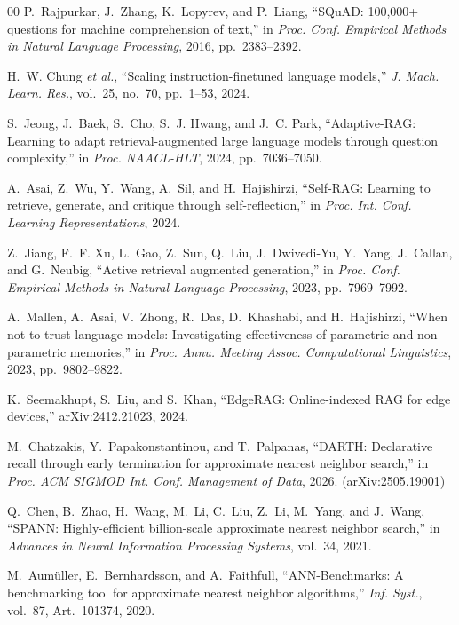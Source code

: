 \documentclass[journal]{IEEEtran}
\begin{document}
\begin{thebibliography}{00}
P.~Rajpurkar, J.~Zhang, K.~Lopyrev, and P.~Liang, ``SQuAD: 100,000+ questions
for machine comprehension of text,'' in \emph{Proc. Conf. Empirical Methods in
Natural Language Processing}, 2016, pp.~2383--2392.

H.~W. Chung \emph{et al.}, ``Scaling instruction-finetuned language models,''
\emph{J. Mach. Learn. Res.}, vol.~25, no.~70, pp.~1--53, 2024.

S.~Jeong, J.~Baek, S.~Cho, S.~J. Hwang, and J.~C. Park, ``Adaptive-RAG:
Learning to adapt retrieval-augmented large language models through question
complexity,'' in \emph{Proc. NAACL-HLT}, 2024, pp.~7036--7050.

A.~Asai, Z.~Wu, Y.~Wang, A.~Sil, and H.~Hajishirzi, ``Self-RAG: Learning to
retrieve, generate, and critique through self-reflection,'' in \emph{Proc.
Int. Conf. Learning Representations}, 2024.

Z.~Jiang, F.~F. Xu, L.~Gao, Z.~Sun, Q.~Liu, J.~Dwivedi-Yu, Y.~Yang, J.~Callan,
and G.~Neubig, ``Active retrieval augmented generation,'' in \emph{Proc. Conf.
Empirical Methods in Natural Language Processing}, 2023, pp.~7969--7992.

A.~Mallen, A.~Asai, V.~Zhong, R.~Das, D.~Khashabi, and H.~Hajishirzi, ``When
not to trust language models: Investigating effectiveness of parametric and
non-parametric memories,'' in \emph{Proc. Annu. Meeting Assoc. Computational
Linguistics}, 2023, pp.~9802--9822.

K.~Seemakhupt, S.~Liu, and S.~Khan, ``EdgeRAG: Online-indexed RAG for edge
devices,'' arXiv:2412.21023, 2024.

M.~Chatzakis, Y.~Papakonstantinou, and T.~Palpanas, ``DARTH: Declarative
recall through early termination for approximate nearest neighbor search,'' in
\emph{Proc. ACM SIGMOD Int. Conf. Management of Data}, 2026.
(arXiv:2505.19001)

Q.~Chen, B.~Zhao, H.~Wang, M.~Li, C.~Liu, Z.~Li, M.~Yang, and J.~Wang,
``SPANN: Highly-efficient billion-scale approximate nearest neighbor search,''
in \emph{Advances in Neural Information Processing Systems}, vol.~34, 2021.

M.~Aum\"uller, E.~Bernhardsson, and A.~Faithfull, ``ANN-Benchmarks: A
benchmarking tool for approximate nearest neighbor algorithms,'' \emph{Inf.
Syst.}, vol.~87, Art.~101374, 2020.


\end{thebibliography}
\end{document}
